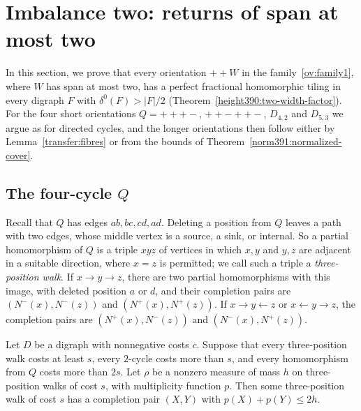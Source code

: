 \section{Imbalance two: returns of span at most two}\label{sec:spantwo}
In this section, we prove that every orientation $++W$ in the family~\ref{ov:family1}, where $W$ has span at most two, has a perfect fractional homomorphic tiling in every digraph $F$ with $\delta^0(F)>|F|/2$ (Theorem~\ref{height390:two-width-factor}).
For the four short orientations $Q=+++-$, $++-++-$, $D_{4,2}$ and $D_{5,3}$ we argue as for directed cycles, and the longer orientations then follow either by Lemma~\ref{transfer:fibres} or from the bounds of Theorem~\ref{norm391:normalized-cover}.

\subsection{The four-cycle \texorpdfstring{$Q$}{Q}}\label{q:section}
Recall that $Q$ has edges $ab,bc,cd,ad$. Deleting a position from $Q$ leaves a path with two edges, whose middle vertex is a source, a sink, or internal. So a partial homomorphism of $Q$ is a triple $xyz$ of vertices in which $x,y$ and $y,z$ are adjacent in a suitable direction, where $x=z$ is permitted; we call such a triple a \emph{three-position walk}.
If $x\to y\to z$, there are two partial homomorphisms with this image, with deleted position $a$ or $d$, and their completion pairs are $(N^-(x),N^-(z))$ and $(N^+(x),N^+(z))$.
If $x\to y\leftarrow z$ or $x\leftarrow y\to z$, the completion pairs are $(N^+(x),N^-(z))$ and $(N^-(x),N^+(z))$.

\begin{lemma}\label{q:endpoint}
Let $D$ be a digraph with nonnegative costs $c$. Suppose that every three-position walk
costs at least $s$, every $2$-cycle costs more than $s$, and every
homomorphism from $Q$ costs more than $2s$. Let $\rho$ be a nonzero
measure of mass $h$ on three-position walks of cost $s$, with multiplicity function $p$. Then some three-position walk of cost $s$ has a completion pair $(X,Y)$ with
$p(X)+p(Y)\le2h$.
\end{lemma}

